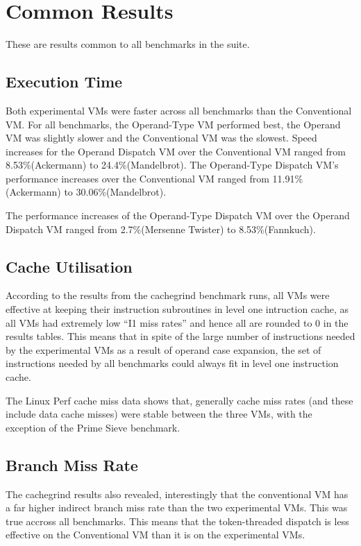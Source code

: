 \documentclass[english,a4paper,12pt]{report}
\begin{document}
\section{Common Results}

These are results common to all benchmarks in the suite.

\subsection{Execution Time}
Both experimental VMs were faster across all benchmarks than the
Conventional VM. For all benchmarks, the Operand-Type VM performed
best, the Operand VM was slightly slower and the Conventional VM was
the slowest. Speed increases for the Operand Dispatch VM over the
Conventional VM ranged from 8.53\%(Ackermann) to
24.4\%(Mandelbrot). The Operand-Type Dispatch VM's performance
increases over the Conventional VM ranged from 11.91\%(Ackermann) to
30.06\%(Mandelbrot). 

The performance increases of the Operand-Type Dispatch VM over the
Operand Dispatch VM ranged from 2.7\%(Mersenne Twister) to
8.53\%(Fannkuch).

\subsection{Cache Utilisation}
According to the results from the cachegrind benchmark runs, all VMs
were effective at keeping their instruction subroutines in level one
intruction cache, as all VMs had extremely low ``I1 miss rates'' and
hence all are rounded to 0 in the results tables. This means that in
spite of the large number of instructions needed by the experimental
VMs as a result of operand case expansion, the set of instructions
needed by all benchmarks could always fit in level one instruction
cache.

The Linux Perf cache miss data shows that, generally cache miss rates
(and these include data cache misses) were stable between the three
VMs, with the exception of the Prime Sieve benchmark.

\subsection{Branch Miss Rate}
The cachegrind results also revealed, interestingly that the
conventional VM has a far higher indirect branch miss rate than the
two experimental VMs. This was true accross all benchmarks. This means
that the token-threaded dispatch is less effective on the Conventional
VM than it is on the experimental VMs. %
\end{document}
